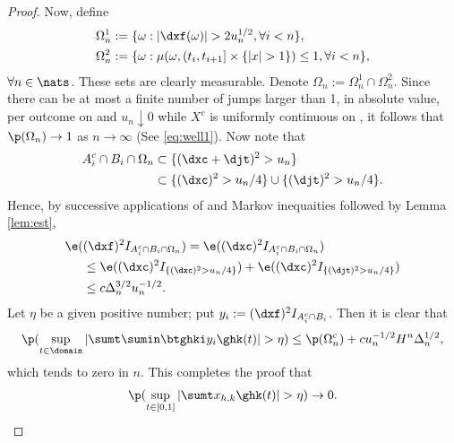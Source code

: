 \begin{proof}
\begin{comment}
\end{comment}
\begin{comment} Moreover, because $\delta >  0$,  \begin{align} \p(w_n > \delta/2) & \le \p\left(\cup_i\{I_{\{\vert x \vert > 1\}}\ast \mu( (t_i, t_{i + 1}] \times \real) > 0   , (\djt)^2 > u_n\}\right) \notag \\ & \le n \p(\mu( [0, 1/n] \times \{\vert x \vert > 1\}) > 0 ) E( (\Delta_1 J^s)^2) u_n^{-1} \notag \\ & \le c n^{-1} \kappa u_n^{-1}\notag,\end{align} which clearly tends to zero in $n$. 
\end{comment}

Now, define
\begin{align}
&\Omega_n^1 := \{\omega : \vert \dxf(\omega) \vert > 2u^{1/2}_n, \forall  i < n\},\notag \\ 
&\Omega_n^2 := \{\omega : \mu(\omega,  (t_i, t_{i+1}] \times \{\vert x \vert > 1\} ) \le 1, \forall i <n  \},\notag 
\end{align}
$\forall n \in \nats$. These sets are clearly measurable. Denote $\Omega_n   := \Omega_n^1 \cap \Omega_n^2 $. Since there can be at most a finite number of jumps  larger than 1,  in absolute value, per outcome on \domain and  $u_n \downarrow 0$ while $X^c$ is uniformly continuous on \domain, it follows that $ \p(\Omega_n) \to 1$ as $n \to \infty$ (See \eqref{eq:well1}). Now note that 
\begin{align}
  \notag
  A_i^c \cap B_i \cap \Omega_n & \subset  \{ (\dxc + \djt)^2 > u_n \} \notag\\
  &\subset \{(\dxc)^2 > u_n/4\} \cup \{(\djt)^2 > u_n/4\}\notag .
  \label{}
\end{align}
Hence, by successive applications of \holder and Markov inequaities followed by Lemma \ref{lem:est},   
\begin{align}
  \notag
 \e(&(\dxf)^2 I_{A_i^c \cap B_i \cap \Omega_n} ) = \e((\dxc)^2 I_{A_i^c \cap B_i \cap \Omega_n} )\notag \\
 &\le \e((\dxc)^2 I_{\{(\dxc)^2 > u_n/4\}}) + \e((\dxc)^2 I_{\{(\djt)^2 > u_n/4\}}) \label{} \notag\\
 & \le c \Delta_n^{3/2} u_n^{-1/2}.\notag
\end{align}
Let $\eta$ be a given positive number; put $y_i :=  (\dxf)^2 I_{A_i^c \cap B_i}$. Then it is clear that
\begin{align}
  \p(\sup_{t \in \domain} \vert \sumt\sumin  \btghki y_i \ghk(t)\vert  > \eta) \le  \p(\Omega_n^c)  + c u^{-1/2}_nH^n\Delta_n^{1/2}, \notag
  \label{}
\end{align}
which tends to zero in $n$.  This completes the proof that \begin{align}\label{eq:x} \p(\sup_{t \in [0,1]}\vert \sumt x_{h,k} \ghk(t) \vert > \eta) \to 0. \end{align}


\end{proof}
